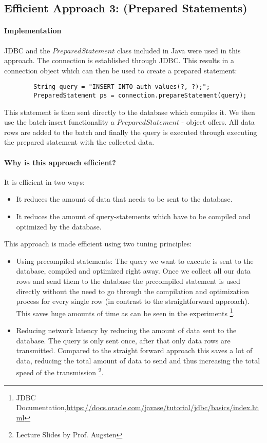 \documentclass[11pt]{scrartcl}
\begin{document}
    \subsection*{Efficient Approach 3: (Prepared Statements)}

  \paragraph{Implementation}

	JDBC and the $PreparedStatement$ class included in Java were used in this approach. The connection is established through JDBC. This results in a connection object which can then be used to create a prepared statement:
	{\small
	\begin{verbatim}
		String query = "INSERT INTO auth values(?, ?);";
		PreparedStatement ps = connection.prepareStatement(query);
	\end{verbatim}
	}

	This statement is then sent directly to the database which compiles it. We then use the batch-insert functionality a $PreparedStatement$ - object offers. All data rows are added to the batch and finally the query is executed through executing the prepared statement with the collected data.

  \paragraph{Why is this approach efficient?}

  It is efficient in two ways:
  \begin{itemize}
  	\item It reduces the amount of data that needs to be sent to the database.
  	\item It reduces the amount of query-statements which have to be compiled and optimized by the database.
  \end{itemize}

	This approach is made efficient using two tuning principles:
	\begin{itemize}
		\item Using precompiled statements: The query we want to execute is sent to the database, compiled and optimized  right away. Once we collect all our data rows and send them to the database the precompiled statement is used directly without the need to go through the compilation and optimization process for every single row (in contrast to the straightforward approach). This saves huge amounts of time as can be seen in the experiments
        \footnote{JDBC Documentation,\url{https://docs.oracle.com/javase/tutorial/jdbc/basics/index.html}}.
		\item Reducing network latency by reducing the amount of data sent to the database. The query is only sent once, after that only data rows are transmitted. Compared to the straight forward approach this saves a lot of data, reducing the total amount of data to send and thus increasing the total speed of the transmission
        \footnote{Lecture Slides by Prof. Augsten}.
\end{itemize}
\end{document}
